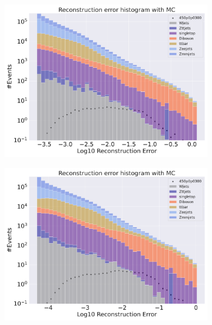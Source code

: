 \begin{figure}[H]
    \centering
    \begin{subfigure}{.45\textwidth}
        \includegraphics[width=\textwidth]{Figures/AE_testing/big/2lep/b_data_recon_big_rm3_feats_sig_450p0p0300_.pdf}
        \caption{ }
        \label{fig:AE_2lep_big_450}
    \end{subfigure}
    \hfill
    \begin{subfigure}{.45\textwidth}
        \includegraphics[width=\textwidth]{Figures/AE_testing/small/2lep/b_data_recon_big_rm3_feats_sig_450p0p0300_.pdf}
        \caption{}
        \label{fig:AE_2lep_small_450}
    \end{subfigure}
    \hfill
    \begin{subfigure}{.45\textwidth}

\end{subfigure}
\end{figure}

